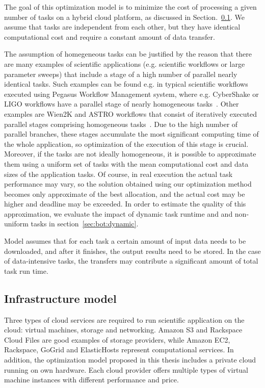 {  The goal of this optimization model is to minimize the cost of processing a given number of tasks on a hybrid cloud platform, as discussed in Section.~\ref{sec:intro:cloud:model}. We assume that tasks are independent from each other, but they have identical computational cost and require a constant amount of data transfer. 

  The assumption of homegeneous tasks can be justified by the reason that there are many examples of scientific applications (e.g. scientific workflows or large parameter sweeps) that include a stage of a high number of parallel nearly identical tasks. Such examples can be found e.g. in typical scientific workflows executed using Pegasus Workflow Management system, where e.g. CyberShake or LIGO workflows have a parallel stage of nearly homogeneous tasks~\cite{Bharathi08}. Other examples are Wien2K and ASTRO workflows that consist of iteratively executed parallel stages comprising homogeneous tasks~\cite{Duan12}. Due to the high number of parallel branches, these stages accumulate the most significant computing time of the whole application, so optimization of the execution of this stage is crucial. Moreover, if the tasks are not ideally homogeneous, it is possible to approximate them using a uniform set of tasks with the mean computational cost and data sizes of the application tasks. Of course, in real execution the actual task performance may vary, so the solution obtained using our optimization method becomes only approximate of the best allocation, and the actual cost may be higher and deadline may be exceeded. In order to estimate the quality of this approximation, we evaluate the impact of dynamic task runtime and and non-uniform tasks in section~\ref{sec:bot:dynamic}. 

  Model assumes that for each task a certain amount of input data needs to be downloaded, and after it finishes, the output results need to be stored. In the case of data-intensive tasks, the transfers may contribute a significant amount of total task run time.

\subsection{Infrastructure model}
\label{sec:intro:cloud:model}

Three types of cloud services are required to run scientific application on the cloud: virtual machines, storage and networking. Amazon S3 and Rackspace Cloud Files are good examples of storage providers, while Amazon EC2, Rackspace, GoGrid and ElasticHosts represent computational services. In addition, the optimization model proposed in this thesis includes a private cloud running on own hardware. Each cloud provider offers multiple types of virtual machine instances with different performance and price.

}
